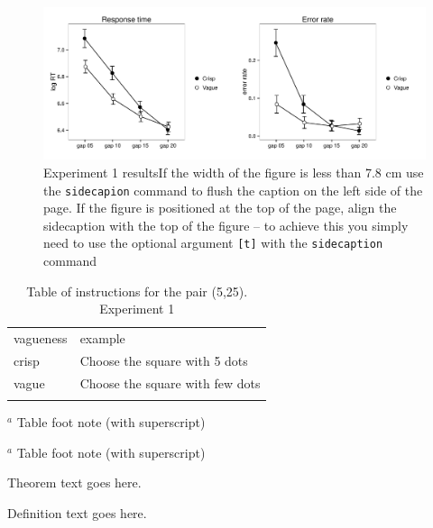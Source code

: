 \begin{figure}[b]
\sidecaption
\includegraphics[scale=.5]{images/resultse1}
\caption{Experiment 1 resultsIf the width of the figure is less than 7.8 cm use the \texttt{sidecapion} command to flush the caption on the left side of the page. If the figure is positioned at the top of the page, align the sidecaption with the top of the figure -- to achieve this you simply need to use the optional argument \texttt{[t]} with the \texttt{sidecaption} command}
\label{resultse1}
\end{figure}


\begin{table}
\caption{Table of instructions for the pair (5,25). Experiment 1}
\label{instructionse1} 
\begin{tabular}{| l | l |}
\hline\noalign{\smallskip}
vagueness&example\\
\noalign{\smallskip}\svhline\noalign{\smallskip}
crisp 	& 	Choose the square with 5 dots \\
vague	&	Choose the square with few dots\\
\noalign{\smallskip}\hline\noalign{\smallskip}
\end{tabular}
$^a$ Table foot note (with superscript)\\
\end{table}


\begin{table}
\caption{}
\label{} 
\begin{tabular}{}
\hline\noalign{\smallskip}

\noalign{\smallskip}\svhline\noalign{\smallskip}

\noalign{\smallskip}\hline\noalign{\smallskip}
\end{tabular}
$^a$ Table foot note (with superscript)\\
\end{table}



\begin{theorem}
Theorem text goes here.
\end{theorem}
%
%
\begin{definition}
Definition text goes here.
\end{definition}

